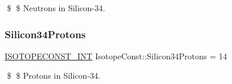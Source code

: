 \$ \$ Neutrons in Silicon-\/34. \mbox{\label{group___isotope_const-_silicon-_si34_ga269a11c0544f366a5f5824293e4ddcc9}} 
\subsubsection{\texorpdfstring{Silicon34\+Protons}{Silicon34Protons}}
{\footnotesize\ttfamily \mbox{\hyperlink{group___isotope_const-_macros_ga5f18360b3e99483a35c32d789e62621c}{I\+S\+O\+T\+O\+P\+E\+C\+O\+N\+S\+T\+\_\+\+I\+NT}} Isotope\+Const\+::\+Silicon34\+Protons = 14}

\$ \$ Protons in Silicon-\/34. 